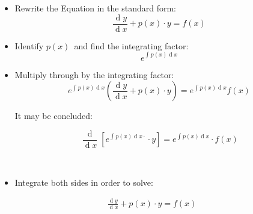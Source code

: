 \documentclass{report}
\def\lthtmlcheckvsize{\ifdim\ht\sizebox<\vsize 
  \ifdim\wd\sizebox<\hsize\expandafter\hfill\fi \expandafter\vfill
  \else\expandafter\vss\fi}%
\begin{document}
{\newpage\clearpage
{}%
\begin{tcolorbox}
\par
\begin{itemize}
    \item Rewrite the Equation in the standard form:
      \begin{displaymath}
      \frac{\operatorname{d}y }{\operatorname{d} x}+ p\left( x \right)\cdot y = f \left( x \right)  
      \end{displaymath}
    \item Identify $p\left( x \right)$\  and find the integrating factor: 
      \begin{displaymath}
      e^{\int^{}_{} p\left( x \right)  \operatorname{d}x }
      \end{displaymath} 
      \item Multiply through by the integrating factor:
        \begin{displaymath}
    e^{\int^{}_{} p\left( x \right)  \operatorname{d}x } \left(  \frac{\operatorname{d}y }{\operatorname{d} x}+ p\left( x \right)\cdot y \right) = e^{\int^{}_{} p\left( x \right)  \operatorname{d}x }f \left( x \right)  
        \end{displaymath}
\par
\subitem It may be concluded:
        \ \
\par
\hfill\begin{minipage}{\dimexpr\textwidth-3cm}
        \begin{displaymath}
        \frac{\operatorname{d} }{\operatorname{d} x}\left[ e^{\int^{}_{} p\left( x \right)  \operatorname{d}x \cdot  } \cdot y\right] = e^{\int^{}_{} p\left( x \right)  \operatorname{d}x } \cdot f \left( x \right) 
        \end{displaymath}
        \end{minipage}
        \ \
\par
\item Integrate both sides in order to solve:
  \end{itemize}
\par
\end{tcolorbox}%
\lthtmlfigureZ
\lthtmlcheckvsize\clearpage}

{\newpage\clearpage
{}%
\begin{align}
\frac{\operatorname{d}y }{\operatorname{d} x} +  p\left( x \right)\cdot  y= f\left( x \right)
\end{align}%
\lthtmlfigureZ
\lthtmlcheckvsize\clearpage}
\end{document}
